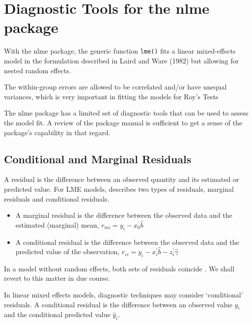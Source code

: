\newpage
\section{Diagnostic Tools for the nlme package}


With the nlme package, the generic function \texttt{lme()} fits a linear mixed-effects model in the formulation described in Laird and Ware (1982) but allowing for nested random effects. 

The within-group errors are allowed to be correlated and/or have unequal variances, which is very important in fitting the models for Roy's Tests

The nlme package has a limited set of diagnostic tools that can be used to assess the model fit. A review of the package manual is sufficient to get a sense of the package's capability in that regard.


\newpage


\subsection{Conditional and Marginal Residuals}
A residual is the difference between an observed quantity and its estimated or predicted value. For LME models, \citet{schab} describes two types of residuals, marginal residuals and conditional residuals. 

\begin{itemize}
	\item A marginal residual is the difference between the observed data and the estimated (marginal) mean, $r_{mi} = y_i - x_0^{\prime} \hat{b}$
	\item A conditional residual is the difference between the observed data and the predicted value of the observation,
	$r_{ci} = y_i - x_i^{\prime} \hat{b} - z_i^{\prime} \hat{\gamma}$	
\end{itemize} 
In a model without random effects, both sets of
residuals coincide \citep{schab} . We shall revert to this matter in due course.







In linear mixed effects models, diagnostic techniques may consider `conditional' residuals. A conditional residual is the difference between an observed value $y_{i}$ and the conditional predicted value $\hat{y}_{i} $.

